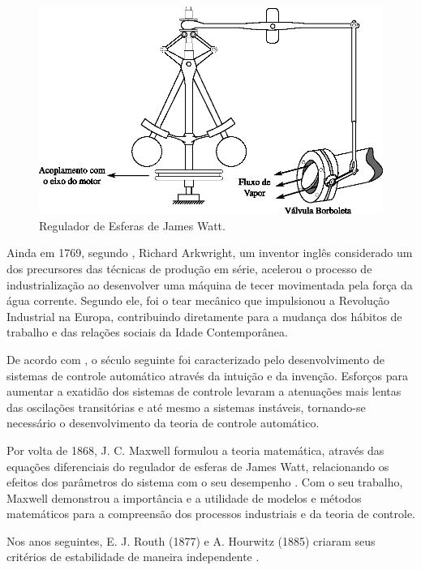 \begin{figure}[htb]
\centering
    \includegraphics{imgs/introducao/eps/regulador_esferas}
    \caption{Regulador de Esferas de James Watt.}
    \label{fig:controlador_james}
\end{figure}

Ainda em 1769, segundo , Richard Arkwright, um inventor
inglês considerado um dos precursores das técnicas de produção em série,
acelerou o processo de industrialização ao desenvolver uma máquina de tecer
movimentada pela força da água corrente. Segundo ele, foi o tear mecânico que
impulsionou a Revolução Industrial na Europa, contribuindo diretamente para a
mudança dos hábitos de trabalho e das relações sociais da Idade Contemporânea. 

De acordo com , o século seguinte foi caracterizado pelo
desenvolvimento de sistemas de controle automático através da intuição e da
invenção. Esforços para aumentar a exatidão dos sistemas de controle levaram a
atenuações mais lentas das oscilações transitórias e até mesmo a sistemas
instáveis, tornando-se necessário o desenvolvimento da teoria de controle
automático.

Por volta de 1868, J. C. Maxwell formulou a teoria matemática, através das
equações diferenciais do regulador de esferas de James Watt, relacionando os
efeitos dos parâmetros do sistema com o seu desempenho \cite{maxwell:1964}. Com
o seu trabalho, Maxwell demonstrou a importância e a utilidade de modelos e
métodos matemáticos para a compreensão dos processos industriais e da teoria de
controle.

Nos anos seguintes, E. J. Routh (1877) e A. Hourwitz (1885) criaram seus
critérios de estabilidade de maneira independente
\cite{routh:1877,bennett:1996,faccin:2004}.

